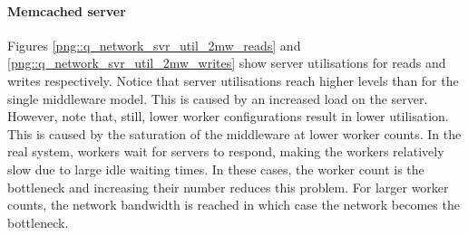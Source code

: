 \documentclass[11pt,a4paper]{article}
\begin{document}
\paragraph{Memcached server}
Figures \ref{png::q_network_svr_util_2mw_reads} and \ref{png::q_network_svr_util_2mw_writes} show server utilisations for reads and writes respectively. Notice that server utilisations reach higher levels than for the single middleware model. This is caused by an increased load on the server. However, note that, still, lower worker configurations result in lower utilisation. This is caused by the saturation of the middleware at lower worker counts. In the real system, workers wait for servers to respond, making the workers relatively slow due to large idle waiting times. In these cases, the worker count is the bottleneck and increasing their number reduces this problem. For larger worker counts, the network bandwidth is reached in which case the network becomes the bottleneck.
\end{document}
